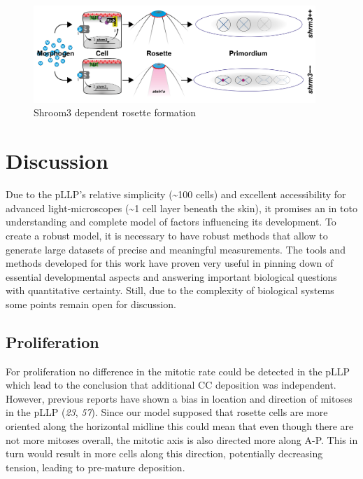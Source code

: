 \documentclass[11pt,singlespacinge,twoside]{reedthesis} %
\begin{document}
\begin{figure}

{\centering \includegraphics[width=0.95\textwidth]{figures/summary/CurrentModel_new-01} 

}

\caption[Shroom3 dependent rosette formation]{Shroom3 dependent rosette formation}\label{fig:summodel}
\end{figure}
\hypertarget{discussion}{%
\chapter{Discussion}\label{discussion}}

Due to the pLLP's relative simplicity (\textasciitilde{}100 cells) and excellent accessibility for advanced light-microscopes (\textasciitilde{}1 cell layer beneath the skin), it promises an in toto understanding and complete model of factors influencing its development.
To create a robust model, it is necessary to have robust methods that allow to generate large datasets of precise and meaningful measurements. The tools and methods developed for this work have proven very useful in pinning down of essential developmental aspects and answering important biological questions with quantitative certainty. Still, due to the complexity of biological systems some points remain open for discussion.

\hypertarget{proliferation-1}{%
\section{Proliferation}\label{proliferation-1}}

For proliferation no difference in the mitotic rate could be detected in the pLLP which lead to the conclusion that additional CC deposition was independent. However, previous reports have shown a bias in location and direction of mitoses in the pLLP (\emph{23}, \emph{57}). Since our model supposed that rosette cells are more oriented along the horizontal midline this could mean that even though there are not more mitoses overall, the mitotic axis is also directed more along A-P. This in turn would result in more cells along this direction, potentially decreasing tension, leading to pre-mature deposition.
\end{document}
